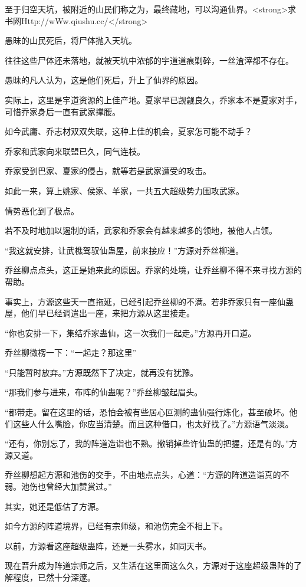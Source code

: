 \begin{this_body}
至于归空天坑，被附近的山民们称之为，最终藏地，可以沟通仙界。<strong>求书网Http://wWw.qiushu.cc/</strong>

愚昧的山民死后，将尸体抛入天坑。

往往这些尸体还未落地，就被天坑中浓郁的宇道道痕剿碎，一丝渣滓都不存在。

愚昧的凡人认为，这是他们死后，升上了仙界的原因。

实际上，这里是宇道资源的上佳产地。夏家早已觊觎良久，乔家本不是夏家对手，可惜乔家身后一直有武家撑腰。

如今武庸、乔志材双双失联，这种上佳的机会，夏家怎可能不动手？

乔家和武家向来联盟已久，同气连枝。

乔家受到巴家、夏家的侵占，就等若是武家遭受的攻击。

如此一来，算上姚家、侯家、羊家，一共五大超级势力围攻武家。

情势恶化到了极点。

若不及时地加以遏制的话，武家和乔家会有越来越多的领地，被他人占领。

“我这就安排，让武樵驾驭仙蛊屋，前来接应！”方源对乔丝柳道。

乔丝柳点点头，这正是她来此的原因。乔家的处境，让乔丝柳不得不来寻找方源的帮助。

事实上，方源这些天一直拖延，已经引起乔丝柳的不满。若非乔家只有一座仙蛊屋，他们早已经调遣出一座，来把方源从这里接走。

“你也安排一下，集结乔家蛊仙，这一次我们一起走。”方源再开口道。

乔丝柳微楞一下：“一起走？那这里”

“只能暂时放弃。”方源既然下了决定，就再没有犹豫。

“那我们参与进来，布阵的仙蛊呢？”乔丝柳皱起眉头。

“都带走。留在这里的话，恐怕会被有些居心叵测的蛊仙强行炼化，甚至破坏。他们这些人什么嘴脸，你应当清楚。而且这种借口，也太好找了。”方源语气淡淡。

“还有，你别忘了，我的阵道造诣也不熟。撤销掉些许仙蛊的把握，还是有的。”方源又道。

乔丝柳想起方源和池伤的交手，不由地点点头，心道：“方源的阵道造诣真的不弱。池伤也曾经大加赞赏过。”

其实，她还是低估了方源。

如今方源的阵道境界，已经有宗师级，和池伤完全不相上下。

以前，方源看这座超级蛊阵，还是一头雾水，如同天书。

现在晋升成为阵道宗师之后，又生活在这里面这么久，方源对于这座超级蛊阵的了解程度，已然十分深邃。


\end{this_body}
